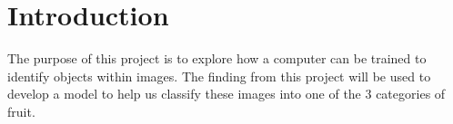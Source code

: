 \documentclass[../main.tex]{subfiles}
\begin{document}
\section{Introduction}

The purpose of this project is to explore how a computer can be trained to identify objects within images. The finding from this project will be used to develop a model to help us classify these images into one of the 3 categories of fruit.
\end{document}
